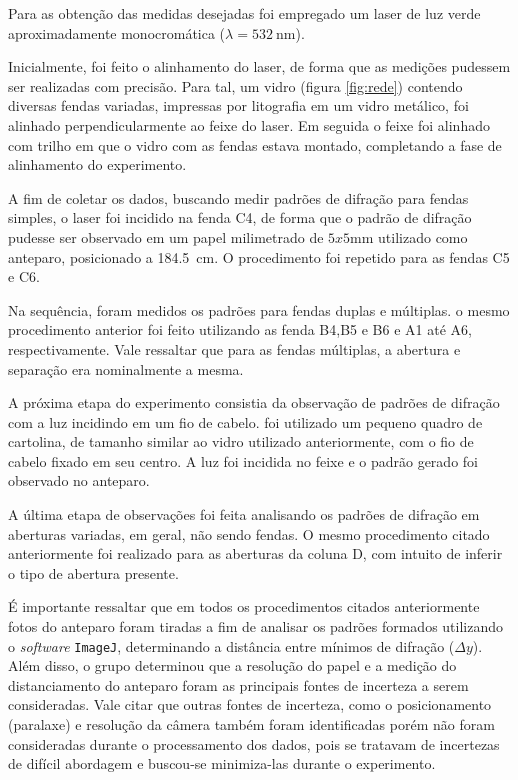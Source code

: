 Para as obtenção das medidas desejadas foi empregado um laser de luz verde aproximadamente monocromática ($\lambda = \SI{532}{\nano\meter}$). 

Inicialmente, foi feito o alinhamento do laser, de forma que as medições pudessem ser realizadas com precisão. Para tal, um vidro (figura \ref{fig:rede}) contendo diversas fendas variadas, impressas por litografia em um vidro metálico, foi alinhado perpendicularmente ao feixe do laser. Em seguida o feixe foi alinhado com trilho em que o vidro com as fendas estava montado, completando a fase de alinhamento do experimento. 



A fim de coletar os dados, buscando medir padrões de difração para fendas simples, o laser foi incidido na fenda C4, de forma que o padrão de difração pudesse ser observado em um papel milimetrado de $5x5\si{\milli\meter}$ utilizado como anteparo, posicionado a \SI{184,5}{\centi\meter}. O procedimento foi repetido para as fendas C5 e C6.

Na sequência, foram medidos os padrões para fendas duplas e múltiplas. o mesmo procedimento anterior foi feito utilizando as fenda B4,B5 e B6 e A1 até A6, respectivamente. Vale ressaltar que para as fendas múltiplas, a abertura e separação era nominalmente a mesma.

A próxima etapa do experimento consistia da observação de padrões de difração com a luz incidindo em um fio de cabelo. foi utilizado um pequeno quadro de cartolina, de tamanho similar ao vidro utilizado anteriormente, com o fio de cabelo fixado em seu centro. A luz foi incidida no feixe e o padrão gerado foi observado no anteparo.

A última etapa de observações foi feita analisando os padrões de difração em aberturas variadas, em geral, não sendo fendas. O mesmo procedimento citado anteriormente foi realizado para as aberturas da coluna D, com intuito de inferir o tipo de abertura presente.

É importante ressaltar que em todos os procedimentos citados anteriormente fotos do anteparo foram tiradas a fim de analisar os padrões formados utilizando o \textit{software} \texttt{ImageJ}, determinando a distância entre mínimos de difração ($\Delta y$). Além disso, o grupo determinou que a resolução do papel e a medição do distanciamento do anteparo foram as principais fontes de incerteza a serem consideradas. Vale citar que outras fontes de incerteza, como o posicionamento (paralaxe) e resolução da câmera também foram identificadas porém não foram consideradas durante o processamento dos dados, pois se tratavam de incertezas de difícil abordagem e buscou-se minimiza-las durante o experimento.


